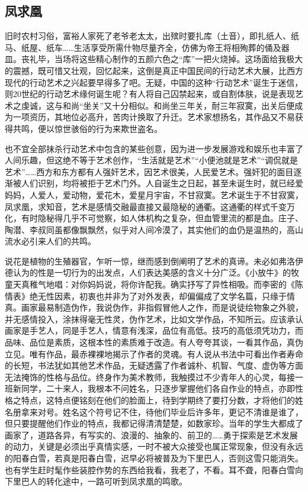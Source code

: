 \documentclass{article}
\begin{document}
\subsection{凤求凰}
旧时农村习俗，富裕人家死了老爷老太太，出殡时要扎库（土音），即扎纸人、纸马、纸屋、纸车……生活享受所需什物尽量齐全，仿佛为帝王将相殉葬的俑及器皿。丧礼毕，当场将这些精心制作的五颜六色之“库”一把火烧掉。这场面给我极大的震撼，既可惜又壮观，回忆起来，这倒是真正中国民间的行动艺术大展，比西方现代的行动艺术之兴起要早得多了吧。无疑，中国的这种“行动艺术”诞生于迷信，则20世纪的行动艺术缘何诞生呢？有人将自己囚禁起来，或自割体肤，说是表现艺术之虔诚，这与和尚“坐关”又十分相似。和尚坐三年关，耐三年寂寞，出关后便成为一项资历，其地位必高升，苦肉计换取了升迁。艺术家想扬名，其作品又不易获得共鸣，便以惊世骇俗的行为来欺世盗名。

也不宜全部抹杀行动艺术中包含的某些创意，因为进一步发展游戏和娱乐也丰富了人间乐趣，但这绝不等于艺术创作，“生活就是艺术”“小便池就是艺术”“调侃就是艺术”……西方和东方都有人强奸艺术，因艺术很美，人民爱艺术。强奸犯的面目逐渐被人们识别，均将被拒于艺术门外。人自诞生之日起，甚至未诞生时，就已经爱妈妈，人爱人，爱动物，爱花木，爱星月宇宙，不甘寂寞。艺术诞生于不甘寂寞，凤求凰，求知音，艺术是感情交融最直接又最隐秘的通衢。这通衢的样式千变万化，有时隐秘得几乎不可觉察，如人体机构之复杂，但血管里流的都是血。庄子、陶潜、李叔同虽都像飘飘然，似乎对人间冷漠了，其实他们的血仍是温热的，高山流水必引来人们的共鸣。

说花是植物的生殖器官，乍听一惊，继而感到倒阐明了艺术的真谛。未必如弗洛伊德认为的性是一切行为的出发点，人们表达美感的含义十分广泛。《小放牛》的牧童天真稚气地唱：对你妈妈说，将你许配我。确实抒写了异性相吸。而李密的《陈情表》绝无性因素，初衷也并非为了对外发表，却偏偏成了文学名篇，只缘于情真。画家最易制造伪作，我说伪作，非指假冒他人之作，而是说徒绘物象之外貌，并无感情投入，涂抹得毫无性灵，伪作艺术，比如文学作品，不知所云。应该承认画家是手艺人，同是手艺人，情意有浅深，品位有高低。技巧的高低须凭功力，而品味、品位是素质，这根本性的素质难于改造。有人夸夸其谈，一看其作品，真伪立见。唯有作品，最赤裸裸地揭示了作者的灵魂。有人说从书法中可看出作者寿命的长短，书法犹如其他艺术作品，无疑透露了作者诚朴、机智、气度、虚伪等方面无法掩饰的性格与品位。终身作为美术教师，我触摸过不少青年人的心灵，每接一班新同学，二十来人，我根本不问姓名，只逐步掌握他们各自作业的特点，亦即性格之特点，这特点便铭刻在他们的脸面上，待到学期终了要打分数，才将他们的姓名册拿来对号。姓名这个符号记不住，待他们毕业后许多年，更记不清谁是谁了，但只要提醒他们作业的特点，我都记得清清楚楚，如数家珍。当年的学生大都成了画家了，道路各异，有写实的、浪漫的、抽象的、前卫的……勇于探索是艺术发展的动力，关键是必须出乎真情实感，一时不被大众接受也属正常现象，但没有永远的阳春白雪，若真是阳春白雪，迟早必将被普及为下里巴人，否则这雪只能消失。也有学生赶时髦作些装腔作势的东西给我看，我老了，不看。耳不聋，阳春白雪向下里巴人的转化途中，一路可听到凤求凰的鸣歌。
\end{document}
